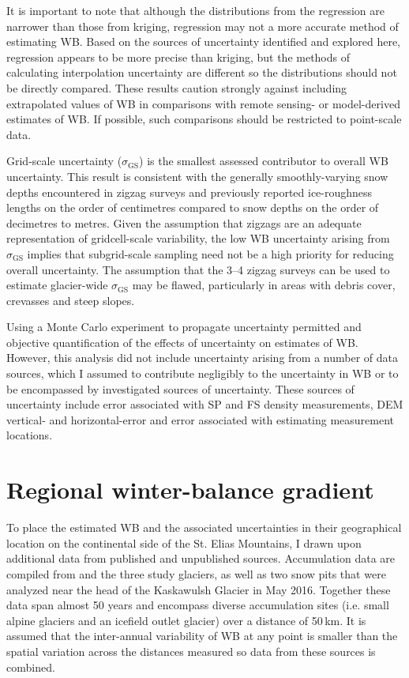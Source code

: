 \documentclass{sfuthesis}
\begin{document}
{It is important to note that although the distributions from the regression are narrower than those from kriging, regression may not a more accurate method of estimating WB. Based on the sources of uncertainty identified and explored here, regression appears to be more precise than kriging, but the methods of calculating interpolation uncertainty are different so the distributions should not be directly compared. These results caution strongly against including extrapolated values of WB in comparisons with remote sensing- or model-derived estimates of WB. If possible, such comparisons should be restricted to point-scale data.

Grid-scale uncertainty ($\sigma_{\mathrm{GS}}$) is the smallest assessed contributor to overall WB uncertainty. This result is consistent with the generally smoothly-varying snow depths encountered in zigzag surveys and previously reported ice-roughness lengths on the order of centimetres \citep[e.g.][]{Hock2005} compared to snow depths on the order of decimetres to metres. Given the assumption that zigzags are an adequate representation of gridcell-scale variability, the low WB uncertainty arising from $\sigma_{\mathrm{GS}}$ implies that subgrid-scale sampling need not be a high priority for reducing overall uncertainty. The assumption that the 3--4 zigzag surveys can be used to estimate glacier-wide $\sigma_{\mathrm{GS}}$ may be flawed, particularly in areas with debris cover, crevasses and steep slopes.

Using a Monte Carlo experiment to propagate uncertainty permitted and objective quantification of the effects of uncertainty on estimates of WB. However, this analysis did not include uncertainty arising from a number of data sources, which I assumed to contribute negligibly to the uncertainty in WB or to be encompassed by investigated sources of uncertainty. These sources of uncertainty include error associated with SP and FS density measurements, DEM vertical- and horizontal-error and error associated with estimating measurement locations.



 \section{Regional winter-balance gradient}
 \label{sec:DonjekAccumGrad}

To place the estimated WB and the associated uncertainties in their geographical location on the continental side of the St. Elias Mountains, I drawn upon additional data from published and unpublished sources. Accumulation data are compiled from \cite{Taylor1969} and the three study glaciers, as well as two snow pits that were analyzed near the head of the Kaskawulsh Glacier in May 2016. Together these data span almost 50 years and encompass diverse accumulation sites (i.e. small alpine glaciers and an icefield outlet glacier) over a distance of 50\,km. It is assumed that the inter-annual variability of WB at any point is smaller than the spatial variation across the distances measured so data from these sources is combined.

}
\end{document}
